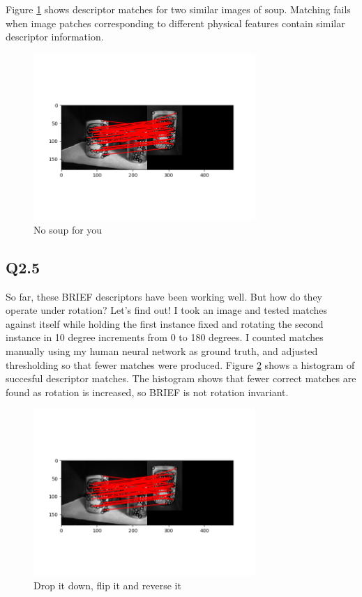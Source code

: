 \documentclass[12pt]{article}
\begin{document}
Figure \ref{fig:plotmatch} shows descriptor matches for two similar images of soup. Matching fails when image patches corresponding to different physical features contain similar descriptor information.

\begin{figure}[H]
\centering
\includegraphics[page=1,width=0.75\textwidth]{q2_4}
\caption{ No soup for you }
\label{fig:plotmatch}
\end{figure}   

\subsection { Q2.5 }

So far, these BRIEF descriptors have been working well. But how do they operate under rotation? Let's find out! I took an image and tested matches against itself while holding the first instance fixed and rotating the second instance in 10 degree increments from 0 to 180 degrees. I counted matches manually using my human neural network as ground truth, and adjusted thresholding so that fewer matches were produced. Figure \ref{fig:rotbad} shows a histogram of succesful descriptor matches. The histogram shows that fewer correct matches are found as rotation is increased, so BRIEF is not rotation invariant.

\begin{figure}[H]
\centering
\includegraphics[page=1,width=0.75\textwidth]{q2_4}
\caption{ Drop it down, flip it and reverse it }
\label{fig:rotbad}
\end{figure}   
\end{document}
